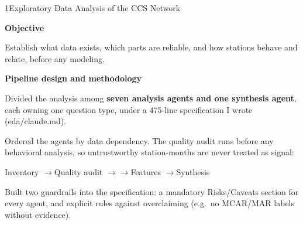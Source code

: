 \documentclass[10pt]{article}
\newcommand{\sectionhead}[1]{%
  \par\vspace{8pt}%
  {\headfont\fontsize{12.5}{15}\selectfont\color{navy}#1\par}%
  \vspace{2.5pt}{\color{rulegray}\hrule height 0.6pt}\vspace{4pt}}
\newcommand{\subhead}[1]{%
  \par\vspace{4.5pt}%
  {\labelfont\bfseries\fontsize{10}{12}\selectfont\color{navy}#1\par}\vspace{1.5pt}}
\newlength{\itemgap}\setlength{\itemgap}{1.5pt}
\newenvironment{points}{\begin{list}{\textcolor{navy}{\small\textbullet}}{%
  \setlength{\leftmargin}{1.05em}\setlength{\labelwidth}{0.7em}%
  \setlength{\labelsep}{0.4em}\setlength{\itemsep}{\itemgap}%
  \setlength{\parsep}{0pt}\setlength{\topsep}{1pt}\setlength{\partopsep}{0pt}}}%
  {\end{list}}
\newcommand{\fp}[1]{{\leavevmode\ttfamily\color{slate}#1}}
\begin{document}
\sectionhead{1\quad Exploratory Data Analysis of the CCS Network}

\subhead{Objective}
Establish what data exists, which parts are reliable, and how stations behave and relate, before any
modeling.

\subhead{Pipeline design and methodology}
\begin{points}
  \item Divided the analysis among \textbf{seven analysis agents and one synthesis agent}, each owning
    one question type, under a 475-line specification I wrote (\fp{eda/claude.md}).
  \item Ordered the agents by data dependency. The quality audit runs before any behavioral analysis,
    so untrustworthy station-months are never treated as signal:
\end{points}
\vspace{4pt}
{\centering{}\fontsize{8.75}{11}\selectfont\color{slate}%
Inventory \enspace$\rightarrow$\enspace Quality audit \enspace$\rightarrow$ \enspace$\rightarrow$\enspace Features \enspace$\rightarrow$\enspace Synthesis\par}
\vspace{4pt}
\begin{points}
  \item Built two guardrails into the specification: a mandatory Risks/Caveats section for every agent,
    and explicit rules against overclaiming (e.g.\ no MCAR/MAR labels without evidence).
\end{points}
\end{document}
